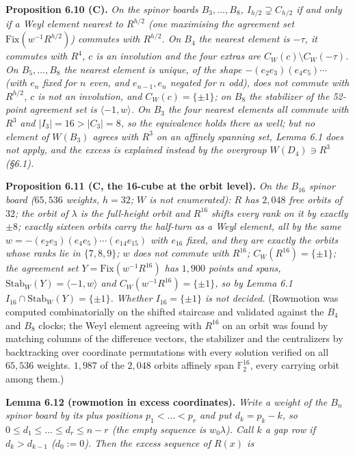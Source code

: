 \documentclass[
]{article}
\begin{document}
\textbf{Proposition 6.10 (C).} \emph{On the spinor boards
\(B_3, \dots, B_8\), \(I_{h/2} \supsetneq C_{h/2}\) if and only if a
Weyl element nearest to \(R^{h/2}\) (one maximising the agreement set
\(\mathrm{Fix}(w^{-1}R^{h/2})\)) commutes with \(R^{h/2}\). On \(B_4\)
the nearest element is \(-\tau\), it commutes with \(R^4\), \(c\) is an
involution and the four extras are \(C_W(c) \setminus C_W(-\tau)\). On
\(B_5, \dots, B_8\) the nearest element is unique, of the shape
\(-(e_2e_3)(e_4e_5)\cdots\) (with \(e_n\) fixed for \(n\) even, and
\(e_{n-1}, e_n\) negated for \(n\) odd), does not commute with
\(R^{h/2}\), \(c\) is not an involution, and \(C_W(c) = \{\pm 1\}\); on
\(B_8\) the stabilizer of the 52-point agreement set is
\(\langle -1, w \rangle\). On \(B_3\) the four nearest elements all
commute with \(R^3\) and \(|I_3| = 16 > |C_3| = 8\), so the equivalence
holds there as well; but no element of \(W(B_3)\) agrees with \(R^3\) on
an affinely spanning set, Lemma 6.1 does not apply, and the excess is
explained instead by the overgroup \(W(D_4) \ni R^3\) (§6.1).}

\textbf{Proposition 6.11 (C, the 16-cube at the orbit level).} \emph{On
the \(B_{16}\) spinor board (\(65{,}536\) weights, \(h = 32\); \(W\) is
not enumerated): \(R\) has \(2{,}048\) free orbits of \(32\); the orbit
of \(\lambda\) is the full-height orbit and \(R^{16}\) shifts every rank
on it by exactly \(\pm 8\); exactly sixteen orbits carry the half-turn
as a Weyl element, all by the same
\(w = -(e_2e_3)(e_4e_5)\cdots(e_{14}e_{15})\) with \(e_{16}\) fixed, and
they are exactly the orbits whose ranks lie in \(\{7,8,9\}\); \(w\) does
not commute with \(R^{16}\); \(C_W(R^{16}) = \{\pm 1\}\); the agreement
set \(Y = \mathrm{Fix}(w^{-1}R^{16})\) has \(1{,}900\) points and spans,
\(\mathrm{Stab}_W(Y) = \langle -1, w \rangle\) and
\(C_W(w^{-1}R^{16}) = \{\pm 1\}\), so by Lemma 6.1
\(I_{16} \cap \mathrm{Stab}_W(Y) = \{\pm 1\}\). Whether
\(I_{16} = \{\pm 1\}\) is not decided.} (Rowmotion was computed
combinatorially on the shifted staircase and validated against the
\(B_4\) and \(B_8\) clocks; the Weyl element agreeing with \(R^{16}\) on
an orbit was found by matching columns of the difference vectors, the
stabilizer and the centralizers by backtracking over coordinate
permutations with every solution verified on all \(65{,}536\) weights.
\(1{,}987\) of the \(2{,}048\) orbits affinely span
\(\mathbb{F}_2^{16}\), every carrying orbit among them.)

\textbf{Lemma 6.12 (rowmotion in excess coordinates).} \emph{Write a
weight of the \(B_n\) spinor board by its plus positions
\(p_1 < \dots < p_r\) and put \(d_k = p_k - k\), so
\(0 \le d_1 \le \dots \le d_r \le n - r\) (the empty sequence is
\(w_0\lambda\)). Call \(k\) a gap row if \(d_k > d_{k-1}\)
(\(d_0 := 0\)). Then the excess sequence of \(R(x)\) is}
\end{document}
